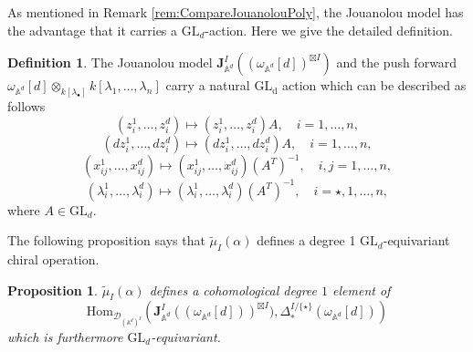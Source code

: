 \documentclass[11pt]{amsart}
\newtheorem{prop}[thm]{Proposition}
\theoremstyle{definition}
\newtheorem{defn}[thm]{Definition}
\theoremstyle{remark}
\numberwithin{equation}{section}
\begin{document}
As mentioned in Remark \ref{rem:CompareJouanolouPoly}, the Jouanolou model has the advantage that it carries a $\mathrm{GL}_d$-action. Here we give the detailed definition. 
\begin{defn}
   The Jouanolou model $ \mathbf{J}^{ I}_{\mathbb{A}^{d}}((\omega_{\mathbb{A}^{d}}[d])^{\boxtimes I})$ and the push forward $\omega_{\mathbb{A}^{d}}[d]\otimes_{k[\lambda_{\bullet}]}k[\lambda_{1},\dots,\lambda_{n}]$ carry a natural $\mathrm{GL_d}$ action which can be described as follows
   $$
   (z^1_i,\dots,z^d_i)\mapsto  (z^1_i,\dots,z^d_i)A,\quad i=1,\dots,n,
   $$
    $$
   (dz^1_i,\dots,dz^d_i)\mapsto  (dz^1_i,\dots,dz^d_i)A,\quad i=1,\dots,n,
   $$
    $$
   (x^1_{ij},\dots,x^d_{ij})\mapsto  (x^1_{ij},\dots,x^d_{ij})(A^{T})^{-1},\quad i,j=1,\dots,n,
   $$
 $$
   (\lambda^1_i,\dots,\lambda^d_i)\mapsto  (\lambda^1_i,\dots,\lambda^d_i)(A^{T})^{-1},\quad i=\star,1,\dots,n,
   $$
   where $A\in \mathrm{GL}_d$.
\end{defn}
The following proposition says that $\tilde{\mu}_{ I}(\alpha)$ defines a degree 1 $\mathrm{GL}_d$-equivariant chiral operation.
\begin{prop}
    $\tilde{\mu}_{ I}(\alpha)$ defines a cohomological degree $1$ element of
    \[
      \mathrm{Hom}_{\mathcal{D}_{(\mathbb{A}^d)^{I}}}\left(\mathbf{J}_{\mathbb{A}^d}^{I}((\omega_{\mathbb{A}^{d}}[d]))^{\boxtimes I}),\Delta^{I/\{\star\}}_*(\omega_{\mathbb{A}^{d}}[d])\right)
    \]
which is furthermore $\mathrm{GL}_d$-equivariant.
\end{prop}
\end{document}
